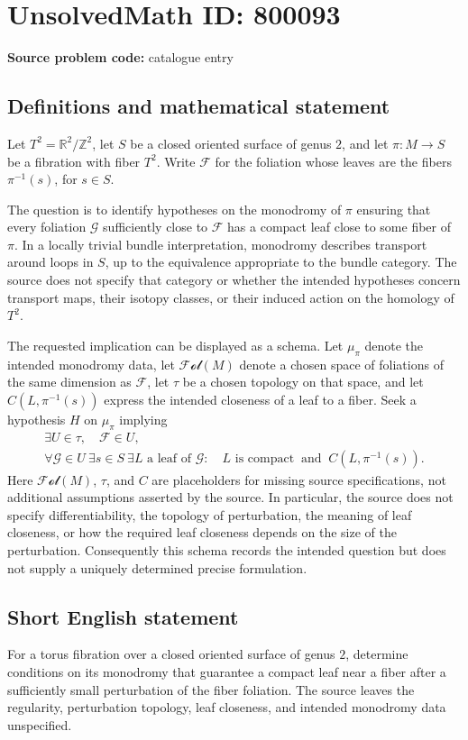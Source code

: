 \documentclass[11pt]{article}
\newcommand{\Z}{\mathbb{Z}}
\newcommand{\R}{\mathbb{R}}
\begin{document}
\section*{UnsolvedMath ID: 800093}
\textbf{Source problem code:} catalogue entry
\subsection{Definitions and mathematical statement}
Let \(T^2=\R^2/\Z^2\), let \(S\) be a closed oriented surface of genus \(2\), and let \(\pi\colon M\to S\) be a fibration with fiber \(T^2\). Write \(\mathcal F\) for the foliation whose leaves are the fibers \(\pi^{-1}(s)\), for \(s\in S\).

The question is to identify hypotheses on the monodromy of \(\pi\) ensuring that every foliation \(\mathcal G\) sufficiently close to \(\mathcal F\) has a compact leaf close to some fiber of \(\pi\). In a locally trivial bundle interpretation, monodromy describes transport around loops in \(S\), up to the equivalence appropriate to the bundle category. The source does not specify that category or whether the intended hypotheses concern transport maps, their isotopy classes, or their induced action on the homology of \(T^2\).

The requested implication can be displayed as a schema. Let \(\mu_\pi\) denote the intended monodromy data, let \(\mathscr{Fol}(M)\) denote a chosen space of foliations of the same dimension as \(\mathcal F\), let \(\tau\) be a chosen topology on that space, and let \(C(L,\pi^{-1}(s))\) express the intended closeness of a leaf to a fiber. Seek a hypothesis \(H\) on \(\mu_\pi\) implying
\[
\begin{gathered}
\exists U\in\tau,\quad \mathcal F\in U,\\
\forall\mathcal G\in U\ \exists s\in S\ \exists L\text{ a leaf of }\mathcal G:\quad
L\text{ is compact}\ \text{ and }\ C(L,\pi^{-1}(s)).
\end{gathered}
\]
Here \(\mathscr{Fol}(M)\), \(\tau\), and \(C\) are placeholders for missing source specifications, not additional assumptions asserted by the source. In particular, the source does not specify differentiability, the topology of perturbation, the meaning of leaf closeness, or how the required leaf closeness depends on the size of the perturbation. Consequently this schema records the intended question but does not supply a uniquely determined precise formulation.
\subsection{Short English statement}
For a torus fibration over a closed oriented surface of genus \(2\), determine conditions on its monodromy that guarantee a compact leaf near a fiber after a sufficiently small perturbation of the fiber foliation. The source leaves the regularity, perturbation topology, leaf closeness, and intended monodromy data unspecified.
\end{document}
